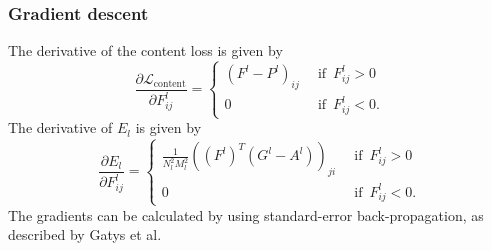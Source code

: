 \subsubsection{Gradient descent}
The derivative of the content loss is given by
\begin{equation}
    \frac{\partial\mathcal{L}_\text{content}}{\partial F_{ij}^l}=\begin{cases}
    (F^l-P^l)_{ij}\,&\text{ if }\,F_{ij}^l>0\\
    0\,&\text{ if }\,F_{ij}^l<0.
    \end{cases}
\end{equation}
The derivative of $E_l$ is given by
\begin{equation}
    \frac{\partial E_l}{\partial F_{ij}^l}=\begin{cases}
    \frac{1}{N_l^2M_l^2}\left((F^l)^T(G^l-A^l)\right)_{ji}\,&\text{ if }\,F_{ij}^l>0\\
    0\,&\text{ if }\,F_{ij}^l<0.
    \end{cases}
\end{equation}
The gradients can be calculated by using standard-error back-propagation, as described by Gatys et al.
\newpage